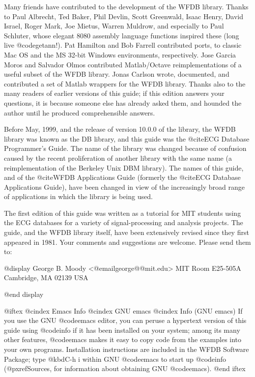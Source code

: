 Many friends have contributed to the development of the WFDB library.  Thanks
to Paul Albrecht, Ted Baker, Phil Devlin, Scott Greenwald, Isaac Henry, David
Israel, Roger Mark, Joe Mietus, Warren Muldrow, and especially to Paul
Schluter, whose elegant 8080 assembly language functions inspired these (long
live @code{getann}!).  Pat Hamilton and Bob Farrell contributed ports, to
classic Mac OS and the MS 32-bit Windows environments, respectively.  Jose
Garcia Moros and Salvador Olmos contributed Matlab/Octave reimplementations of
a useful subset of the WFDB library.  Jonas Carlson wrote, documented, and
contributed a set of Matlab wrappers for the WFDB library.  Thanks also to the
many readers of earlier versions of this guide; if this edition answers your
questions, it is because someone else has already asked them, and hounded the
author until he produced comprehensible answers.

Before May, 1999, and the release of version 10.0.0 of the library, the
WFDB library was known as the DB library, and this guide was the @cite{ECG
Database Programmer's Guide}.  The name of the library was changed because
of confusion caused by the recent proliferation of another library with
the same name (a reimplementation of the Berkeley Unix DBM library).
The names of this guide, and of the @cite{WFDB Applications Guide} (formerly
the @cite{ECG Database Applications Guide}), have been changed in view of
the increasingly broad range of applications in which the library is being
used.

The first edition of this guide was written as a tutorial for MIT
students using the ECG databases for a variety of signal-processing and
analysis projects.  The guide, and the WFDB library itself, have been
extensively revised since they first appeared in 1981.  Your comments
and suggestions are welcome.  Please send them to:

@display
George B. Moody  <@email{george@@mit.edu}>
MIT Room E25-505A
Cambridge, MA 02139
USA

@end display

@iftex
@cindex Emacs Info
@cindex GNU emacs
@cindex Info (GNU emacs)
If you use the GNU @code{emacs} editor, you can peruse a hypertext
version of this guide using @code{info} if it has been installed on your
system; among its many other features, @code{emacs} makes it easy to
copy code from the examples into your own programs.  Installation
instructions are included in the WFDB Software Package; type @kbd{C-h i}
within GNU @code{emacs} to start up @code{info} (@pxref{Sources}, for
information about obtaining GNU @code{emacs}).
@end iftex

